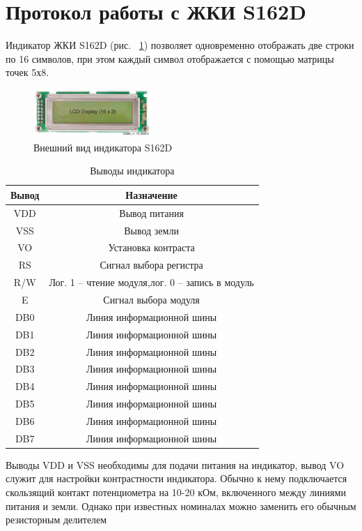 \documentclass[a4paper,oneside ,14pt]{extreport}
\begin{document}
\section{Протокол работы с ЖКИ S162D}

Индикатор ЖКИ S162D (рис. ~\ref{LCD1602}) позволяет одновременно отображать две строки по 16 символов, при этом каждый символ отображается с помощью матрицы точек 5х8. 

\begin{figure}[!ht]
	\centering
	\includegraphics[width=0.4\textwidth]{image/LCD1602.PNG}
	\caption{Внешний вид индикатора S162D}
	\label{LCD1602}
\end{figure}

\begin{table}[!ht]
	\begin{center}
		\begin{tabular}{c c}
			\hline\hline
			Вывод & Назначение \\
			\hline
			VDD & Вывод питания \\
			VSS & Вывод земли \\
			VO & Установка контраста \\
			RS & Сигнал выбора регистра \\
			R/W & Лог. 1 – чтение модуля,лог. 0 – запись в модуль \\
			E & Сигнал выбора модуля \\
			DB0 & Линия информационной шины \\
			DB1 & Линия информационной шины \\
			DB2 & Линия информационной шины \\
			DB3 & Линия информационной шины \\
			DB4 & Линия информационной шины \\
			DB5 & Линия информационной шины \\
			DB6 & Линия информационной шины \\
			DB7 & Линия информационной шины \\
			\hline
		\end{tabular}
		\caption{Выводы индикатора}
		\label{LCD_PIN}
	\end{center}
\end{table}

Выводы VDD и VSS необходимы для подачи питания на индикатор, 
вывод VO служит для настройки контрастности индикатора. Обычно к 
нему подключается скользящий контакт потенциометра на 10-20 
кОм, включенного между линиями питания и земли. Однако при 
известных номиналах можно заменить его обычным резисторным 
делителем
\end{document}
